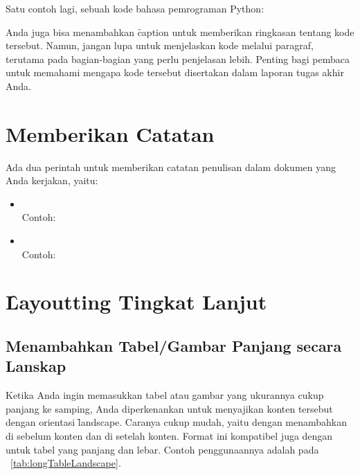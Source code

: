 Satu contoh lagi, sebuah kode bahasa pemrograman Python:


Anda juga bisa menambahkan \f{caption} untuk memberikan ringkasan tentang kode tersebut.
Namun, jangan lupa untuk menjelaskan kode melalui paragraf, terutama pada bagian-bagian yang perlu penjelasan lebih.
Penting bagi pembaca untuk memahami mengapa kode tersebut disertakan dalam laporan tugas akhir Anda.


\section{Memberikan Catatan}
\label{sec:note}
Ada dua perintah untuk memberikan catatan penulisan dalam dokumen yang Anda kerjakan, yaitu:
\begin{itemize}
	\item {} \\
	Contoh: \\ 
	\item {} \\
	Contoh: \todoCite
\end{itemize}


\section{\f{Layoutting} Tingkat Lanjut}
\label{sec:advancedLayoutting}

\subsection{Menambahkan Tabel/Gambar Panjang secara Lanskap}
\label{sec:landscape}
Ketika Anda ingin memasukkan tabel atau gambar yang ukurannya cukup panjang ke samping, Anda diperkenankan untuk menyajikan konten tersebut dengan orientasi \f{landscape}.
Caranya cukup mudah, yaitu dengan menambahkan  di sebelum konten dan  di setelah konten.
Format ini kompatibel juga dengan  untuk tabel yang panjang dan lebar. Contoh penggunaannya adalah pada \tab~\ref{tab:longTableLandscape}.

